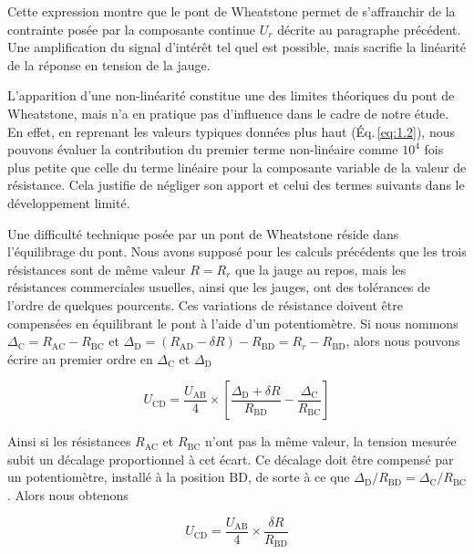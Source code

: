 Cette expression montre que le pont de Wheatstone permet de s'affranchir de la contrainte posée par la composante continue $U_r$ décrite au paragraphe précédent. Une amplification du signal d'intérêt tel quel est possible, mais sacrifie la linéarité de la réponse en tension de la jauge.




L'apparition d'une non-linéarité constitue une des limites théoriques du pont de Wheatstone, mais n'a en pratique pas d'influence dans le cadre de notre étude. En effet, en reprenant les valeurs typiques données plus haut (Éq.\,\ref{eq:1.2}), nous pouvons évaluer la contribution du premier terme non-linéaire comme $10^{4}$ fois plus petite que celle du terme linéaire pour la composante variable de la valeur de résistance. Cela justifie de négliger son apport et celui des termes suivants dans le développement limité.


Une difficulté technique posée par un pont de Wheatstone réside dans l'équilibrage du pont. Nous avons supposé pour les calculs précédents que les trois résistances sont de même valeur $R=R_r$ que la jauge au repos, mais les résistances commerciales usuelles, ainsi que les jauges, ont des tolérances de l'ordre de quelques pourcents. Ces variations de résistance doivent être compensées en équilibrant le pont à l'aide d'un potentiomètre. Si nous nommons $\Delta_{\mathrm{C}} = R_{\mathrm{AC}}-R_{\mathrm{BC}}$ et $\Delta_\mathrm{D} = (R_{\mathrm{AD}} - \delta R)  - R_{\mathrm{BD}} = R_r - R_{\mathrm{BD}}$, alors nous pouvons écrire au premier ordre en $\Delta_{\mathrm{C}}$ et $\Delta_\mathrm{D}$

\begin{equation}
U_{\mathrm{CD}} = \dfrac{U_{\mathrm{AB}}}{4}\times\left[\dfrac{\Delta_\mathrm{D} + \delta R}{R_{\mathrm{BD}}}-\dfrac{\Delta_{\mathrm{C}}}{R_{\mathrm{BC}}}\right]
\end{equation}

Ainsi si les résistances $R_{\mathrm{AC}}$ et $R_{\mathrm{BC}}$ n'ont pas la même valeur, la tension mesurée subit un décalage proportionnel à cet écart. Ce décalage doit être compensé par un potentiomètre, installé à la position $\mathrm{BD}$, de sorte à ce que $\Delta_\mathrm{D}/R_{\mathrm{BD}} = \Delta_\mathrm{C}/R_{\mathrm{BC}}$. Alors nous obtenons

\begin{equation}
U_{\mathrm{CD}} = \dfrac{U_{\mathrm{AB}}}{4}\times\dfrac{\delta R}{R_{\mathrm{BD}}}
\end{equation}

